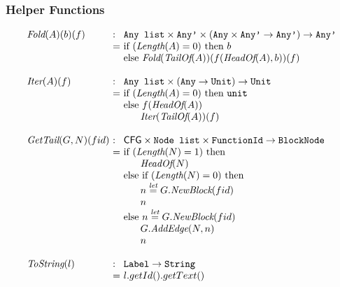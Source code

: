 \subsubsection{Helper Functions}
\[
\begin{array}{l@{}l@{~}l}
\Fold(A)(b)(f) & : & \TT{Any list} \times \TT{Any'} \times (\TT{Any} \times \TT{Any'} \rightarrow \TT{Any'}) \rightarrow \TT{Any'}\\
	& = & \mbox{if}\ (\Length(A) = 0)\ \mbox{then}\ b \\
	& & \mbox{else}\ \Fold(\TailOf(A))(f(\HeadOf(A),b))(f)\\
	& & \\
\Iter(A)(f) & : & \TT{Any list} \times (\TT{Any} \rightarrow \Unit) \rightarrow \Unit\\
	& = & \mbox{if}\ (\Length(A) = 0)\ \mbox{then}\ \TT{unit} \\
	& & \mbox{else}\ f(\HeadOf(A))\\
	& & \phantom{else} \Iter(\TailOf(A))(f)\\
	& & \\
\GetTail(G,N)(fid)\ & : & \CFG \times\Nodelist \times \FunctionId \rightarrow \BlockNode\\
	& = & \mbox{if}\ (\Length(N) = 1)\ \mbox{then}\\
	& & \phantom{else} \HeadOf(N) \\
	& & \mbox{else}\ \mbox{if}\ (\Length(N) = 0)\ \mbox{then}\\
	& & \phantom{else} n \letval G.\emph{NewBlock}(fid)\\
	& & \phantom{else} n\\
	& & \mbox{else}\ n \letval G.\emph{NewBlock}(fid)\\
	& & \phantom{else} G.\emph{AddEdge}(N,n)\\
	& & \phantom{else} n\\
	& & \\
\ToString(l) & : & \TT{Label}  \rightarrow \TT{String}\\
	& = & l.getId().getText()\\
	& & \\
\end{array}
\]

